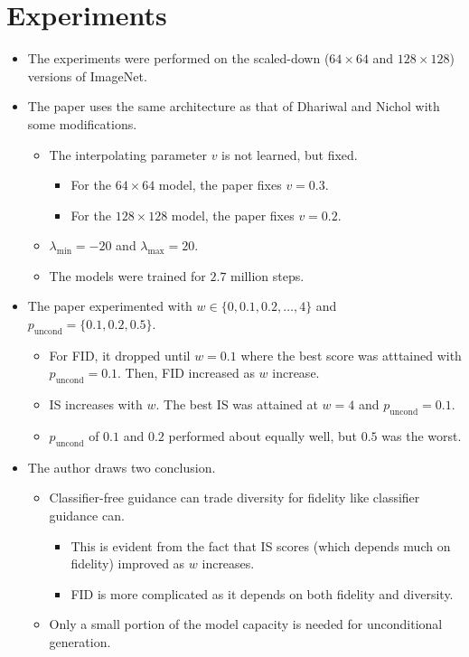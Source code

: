 \documentclass[10pt]{article}
\newcommand{\mrm}[1]{\mathrm{#1}}
\begin{document}
\section{Experiments}

\begin{itemize}
  \item The experiments were performed on the scaled-down ($64 \times 64$ and $128 \times 128$) versions of ImageNet.

  \item The paper uses the same architecture as that of Dhariwal and Nichol \cite{Dhariwal:2021} with some modifications.
  \begin{itemize}
    \item The interpolating parameter $v$ is not learned, but fixed.
    \begin{itemize}
      \item For the $64 \times 64$ model, the paper fixes $v = 0.3$.
      \item For the $128 \times 128$ model, the paper fixes $v = 0.2$.
    \end{itemize}

    \item $\lambda_{\min} = -20$ and $\lambda_{\max} = 20$.
    \item The models were trained for $2.7$ million steps.
  \end{itemize}

  \item The paper experimented with $w \in \{0, 0.1, 0.2, \dotsc, 4\}$ and $p_{\mrm{uncond}} = \{ 0.1, 0.2, 0.5 \}$. 
  \begin{itemize}
    \item For FID, it dropped until $w = 0.1$ where the best score was atttained with $p_{\mrm{uncond}} = 0.1$. Then, FID increased as $w$ increase.
    \item IS increases with $w$. The best IS was attained at $w = 4$ and $p_{\mrm{uncond}} = 0.1$.
    \item $p_{\mrm{uncond}}$ of $0.1$ and $0.2$ performed about equally well, but $0.5$ was the worst.
  \end{itemize}

  \item The author draws two conclusion.
  \begin{itemize}
    \item Classifier-free guidance can trade diversity for fidelity like classifier guidance can.
    \begin{itemize}
      \item This is evident from the fact that IS scores (which depends much on fidelity) improved as $w$ increases.
      \item FID is more complicated as it depends on both fidelity and diversity.
    \end{itemize}

    \item Only a small portion of the model capacity is needed for unconditional generation.
  \end{itemize}
\end{itemize}
\end{document}
